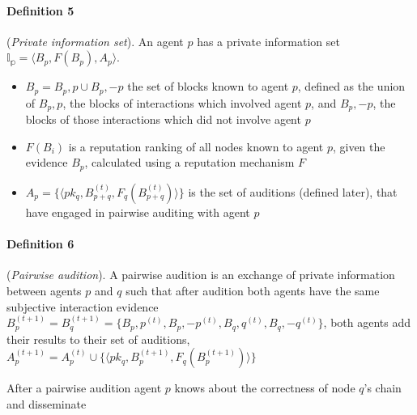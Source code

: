 \paragraph{Definition 5} (\textit{Private information set}). An agent $p$ has a private information set $\mathbb{I_p} = \langle B_p, F(B_p), A_p \rangle$. 
\begin{itemize}
    \item $B_p = B_p,p \cup B_p,-p$ the set of blocks known to agent $p$, defined as the union of $B_p,p$, the blocks of interactions which involved agent $p$, and $B_p,-p$, the blocks of those interactions which did not involve agent $p$
    \item $F(B_i)$ is a reputation ranking of all nodes known to agent $p$, given the evidence $B_p$, calculated using a reputation mechanism $F$
    \item $A_p = \{\langle pk_q, B_{p+q}^{(t)},F_q(B_{p+q}^{(t)})\rangle \}$ is the set of auditions (defined later), that have engaged in pairwise auditing with agent $p$
\end{itemize}

\paragraph{Definition 6} (\textit{Pairwise audition}). A pairwise audition is an exchange of private information between agents $p$ and $q$ such that after audition both agents have the same subjective interaction evidence $B_{p}^{(t+1)} = B_{q}^{(t+1)}= \{B_p,p^{(t)}, B_p,-p^{(t)}, B_q,q^{(t)}, B_q,-q^{(t)} \}$, both agents add their results to their set of auditions, $A_p^{(t+1)} = A_p^{(t)} \cup \{\langle pk_q, B_{p}^{(t+1)},F_q(B_{p}^{(t+1)})\rangle\}$

After a pairwise audition agent $p$ knows about the correctness of node $q$'s chain and disseminate 
